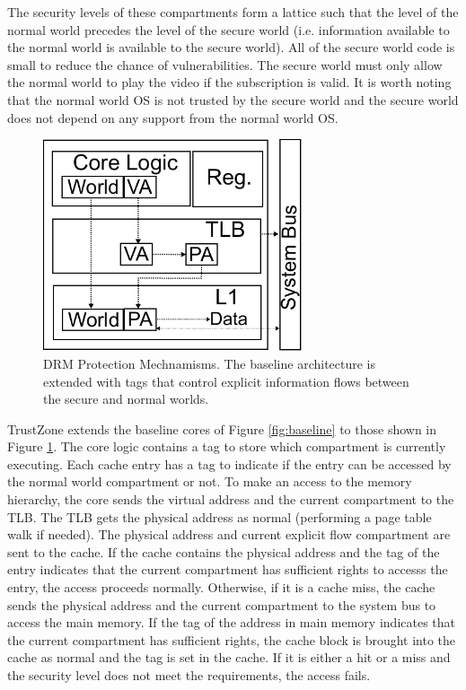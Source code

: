     The security levels of these compartments form a lattice such that the 
    level of the normal world precedes the level of the secure world (i.e. 
    information available to the normal world is available to the secure 
    world). All of the secure world code is small to reduce the chance of 
    vulnerabilities. The secure world must only allow the normal world to play 
    the video if the subscription is valid. It is worth noting that the normal 
    world OS is not trusted by the secure world and the secure world does not 
    depend on any support from the normal world OS.


    \begin{figure}
        \begin{center}
            \includegraphics[width=3in]{figs/tz_tags.pdf}
            \caption{DRM Protection Mechnamisms. The baseline architecture is 
            extended with tags that control explicit information flows between 
        the secure and normal worlds.}
            \label{fig:tz_uarch}
        \end{center}
    \end{figure}

    TrustZone extends the baseline cores of Figure \ref{fig:baseline} to
    those shown in Figure \ref{fig:tz_uarch}. The core logic contains a tag to 
    store which compartment is currently executing. Each cache entry has a tag to 
    indicate if the entry can be accessed by the normal world compartment or not. To make 
    an access to the memory hierarchy, the core sends the virtual address and 
    the current compartment to the TLB. The TLB gets the physical address as normal 
    (performing a page table walk if needed). The physical address and current 
    explicit flow compartment are sent to the cache. If the cache contains the 
    physical address and the tag of the entry indicates that the current 
    compartment 
    has sufficient rights to accesss the entry, the access proceeds normally.  
    Otherwise, if it is a cache miss, the cache sends the physical address and 
    the current compartment to the system bus to access the main memory. If the tag 
    of the address in main memory indicates that the current compartment has 
    sufficient rights, the cache block is brought into the cache as normal and 
    the tag is set in the cache. If it is either a hit or a miss and the 
    security level does not meet the requirements, the access fails.

